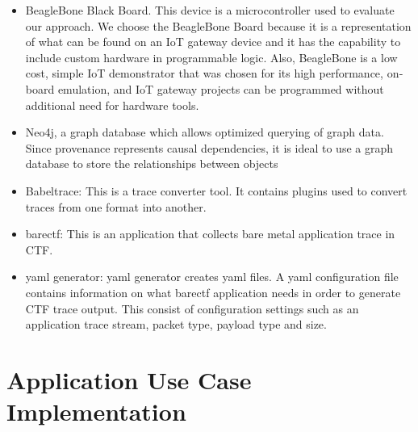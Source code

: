 \begin{itemize}
\item BeagleBone Black Board. This device is a microcontroller used to evaluate our approach. We choose the BeagleBone Board because it is a representation of what can be found on an IoT gateway device and it has the capability to include custom hardware in programmable logic. Also, BeagleBone is a low cost, simple IoT demonstrator that was chosen for its high performance, on­board emulation, and IoT gateway projects can be programmed without additional need for hardware tools.


\item Neo4j, a graph database which allows optimized querying of graph data. Since provenance represents causal dependencies, it is ideal to use a graph database to store the relationships between objects


\item Babeltrace:  This is a trace converter tool. It contains plugins used to convert traces from one format into another. 

\item barectf: This is an application that collects bare metal application trace in CTF.

\item yaml generator: yaml generator creates yaml files. A yaml configuration file contains information on what barectf application needs in order to generate CTF trace output. This consist of configuration settings such as an application trace stream, packet type, payload type and size. 


\end{itemize}


\section{Application Use Case Implementation} \label{use_case_application}

